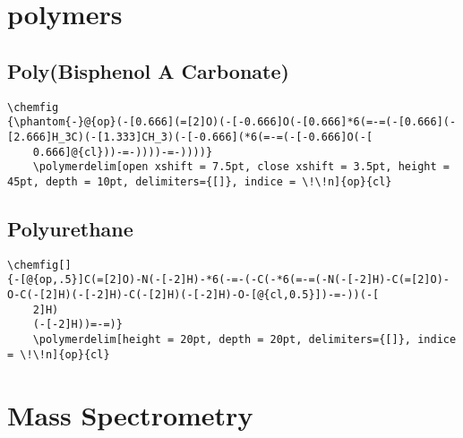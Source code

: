 \chapter{polymers}\label{app:polymers}


\section{Poly(Bisphenol A Carbonate)}\label{app:poly(bisphenol-a-carbonate)}
\begin{lstlisting}
\chemfig
{\phantom{-}@{op}(-[0.666](=[2]O)(-[-0.666]O(-[0.666]*6(=-=(-[0.666](-[2.666]H_3C)(-[1.333]CH_3)(-[-0.666](*6(=-=(-[-0.666]O(-[
    0.666]@{cl}))-=-))))-=-))))}
    \polymerdelim[open xshift = 7.5pt, close xshift = 3.5pt, height = 45pt, depth = 10pt, delimiters={[]}, indice = \!\!n]{op}{cl}
\end{lstlisting}


\section{Polyurethane}\label{app:polyurethane}
\begin{lstlisting}
\chemfig[]
{-[@{op,.5}]C(=[2]O)-N(-[-2]H)-*6(-=-(-C(-*6(=-=(-N(-[-2]H)-C(=[2]O)-O-C(-[2]H)(-[-2]H)-C(-[2]H)(-[-2]H)-O-[@{cl,0.5}])-=-))(-[
    2]H)
    (-[-2]H))=-=)}
    \polymerdelim[height = 20pt, depth = 20pt, delimiters={[]}, indice = \!\!n]{op}{cl}
\end{lstlisting}


\chapter{Mass Spectrometry}\label{app:mass-spectrometry}


